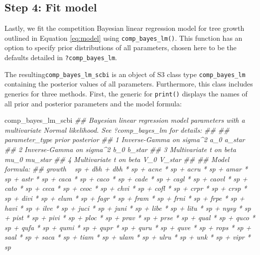 \documentclass[12pt]{article}
\newenvironment{Shaded}{\begin{snugshade}}{\end{snugshade}}
\newcommand{\CommentTok}[1]{\textcolor[rgb]{0.56,0.35,0.01}{\textit{#1}}}
\newcommand{\DataTypeTok}[1]{\textcolor[rgb]{0.13,0.29,0.53}{#1}}
\newcommand{\KeywordTok}[1]{\textcolor[rgb]{0.13,0.29,0.53}{\textbf{#1}}}
\newcommand{\NormalTok}[1]{#1}
\newcommand{\OperatorTok}[1]{\textcolor[rgb]{0.81,0.36,0.00}{\textbf{#1}}}
\newcommand{\OtherTok}[1]{\textcolor[rgb]{0.56,0.35,0.01}{#1}}
\newcommand{\StringTok}[1]{\textcolor[rgb]{0.31,0.60,0.02}{#1}}
\begin{document}
\hypertarget{model-fit-predict}{%
\subsection{Step 4: Fit model}\label{model-fit-predict}}

Lastly, we fit the competition Bayesian linear regression model for tree
growth outlined in Equation \ref{eq:model} using
\texttt{comp\_bayes\_lm()}. This function has an option to specify prior
distributions of all parameters, chosen here to be the defaults detailed
in \texttt{?comp\_bayes\_lm}.

\begin{Shaded}
\end{Shaded}

The resulting\texttt{comp\_bayes\_lm\_scbi} is an object of S3 class
type \texttt{comp\_bayes\_lm} containing the posterior values of all
parameters. Furthermore, this class includes generics for three methods.
First, the generic for \texttt{print()} displays the names of all prior
and posterior parameters and the model formula:

\begin{Shaded}
\begin{Highlighting}[]
\NormalTok{comp_bayes_lm_scbi}
\CommentTok{## Bayesian linear regression model parameters with a multivariate Normal likelihood. See ?comp_bayes_lm for details:}
\CommentTok{## }
\CommentTok{##   parameter_type           prior posterior}
\CommentTok{## 1 Inverse-Gamma on sigma^2 a_0   a_star   }
\CommentTok{## 2 Inverse-Gamma on sigma^2 b_0   b_star   }
\CommentTok{## 3 Multivariate t on beta   mu_0  mu_star  }
\CommentTok{## 4 Multivariate t on beta   V_0   V_star   }
\CommentTok{## }
\CommentTok{## Model formula:}
\CommentTok{## growth ~ sp + dbh + dbh * sp + acne * sp + acru * sp + amar * sp + astr * sp + caca * sp + caco * sp + cade * sp + cagl * sp + caovl * sp + cato * sp + ceca * sp + ceoc * sp + chvi * sp + cofl * sp + crpr * sp + crsp * sp + divi * sp + elum * sp + fagr * sp + fram * sp + frni * sp + frpe * sp + havi * sp + ilve * sp + juci * sp + juni * sp + libe * sp + litu * sp + nysy * sp + pist * sp + pivi * sp + ploc * sp + prav * sp + prse * sp + qual * sp + quco * sp + qufa * sp + qumi * sp + qupr * sp + quru * sp + quve * sp + rops * sp + saal * sp + saca * sp + tiam * sp + ulam * sp + ulru * sp + unk * sp + vipr * sp}
\end{Highlighting}
\end{Shaded}
\end{document}
